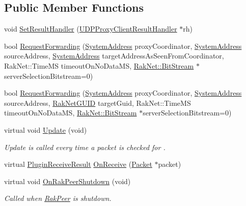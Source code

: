 \subsection*{Public Member Functions}
\begin{DoxyCompactItemize}
\item 
void \hyperlink{class_rak_net_1_1_u_d_p_proxy_client_a8fc30b0a5224d0efe7ed9fe2ff9841d1}{Set\-Result\-Handler} (\hyperlink{struct_rak_net_1_1_u_d_p_proxy_client_result_handler}{U\-D\-P\-Proxy\-Client\-Result\-Handler} $\ast$rh)
\item 
bool \hyperlink{class_rak_net_1_1_u_d_p_proxy_client_a94ee5defadaa018d15de5ed2498625ad}{Request\-Forwarding} (\hyperlink{struct_rak_net_1_1_system_address}{System\-Address} proxy\-Coordinator, \hyperlink{struct_rak_net_1_1_system_address}{System\-Address} source\-Address, \hyperlink{struct_rak_net_1_1_system_address}{System\-Address} target\-Address\-As\-Seen\-From\-Coordinator, Rak\-Net\-::\-Time\-M\-S timeout\-On\-No\-Data\-M\-S, \hyperlink{class_rak_net_1_1_bit_stream}{Rak\-Net\-::\-Bit\-Stream} $\ast$server\-Selection\-Bitstream=0)
\item 
bool \hyperlink{class_rak_net_1_1_u_d_p_proxy_client_a94193970bef43ead993f1dfb734d3f73}{Request\-Forwarding} (\hyperlink{struct_rak_net_1_1_system_address}{System\-Address} proxy\-Coordinator, \hyperlink{struct_rak_net_1_1_system_address}{System\-Address} source\-Address, \hyperlink{struct_rak_net_1_1_rak_net_g_u_i_d}{Rak\-Net\-G\-U\-I\-D} target\-Guid, Rak\-Net\-::\-Time\-M\-S timeout\-On\-No\-Data\-M\-S, \hyperlink{class_rak_net_1_1_bit_stream}{Rak\-Net\-::\-Bit\-Stream} $\ast$server\-Selection\-Bitstream=0)
\item 
\hypertarget{class_rak_net_1_1_u_d_p_proxy_client_a0ef9ece963dde728a09c78f849683daf}{virtual void \hyperlink{class_rak_net_1_1_u_d_p_proxy_client_a0ef9ece963dde728a09c78f849683daf}{Update} (void)}\label{class_rak_net_1_1_u_d_p_proxy_client_a0ef9ece963dde728a09c78f849683daf}

\begin{DoxyCompactList}\small\item\em Update is called every time a packet is checked for . \end{DoxyCompactList}\item 
virtual \hyperlink{group___p_l_u_g_i_n___i_n_t_e_r_f_a_c_e___g_r_o_u_p_ga89998adaafb29e5d879113b992161085}{Plugin\-Receive\-Result} \hyperlink{class_rak_net_1_1_u_d_p_proxy_client_a92e2cefd0e42ee8a86fde60e32cd53c2}{On\-Receive} (\hyperlink{struct_rak_net_1_1_packet}{Packet} $\ast$packet)
\item 
\hypertarget{class_rak_net_1_1_u_d_p_proxy_client_ac310e4654dd16088934f393345c2dc5c}{virtual void \hyperlink{class_rak_net_1_1_u_d_p_proxy_client_ac310e4654dd16088934f393345c2dc5c}{On\-Rak\-Peer\-Shutdown} (void)}\label{class_rak_net_1_1_u_d_p_proxy_client_ac310e4654dd16088934f393345c2dc5c}

\begin{DoxyCompactList}\small\item\em Called when \hyperlink{class_rak_net_1_1_rak_peer}{Rak\-Peer} is shutdown. \end{DoxyCompactList}\end{DoxyCompactItemize}
